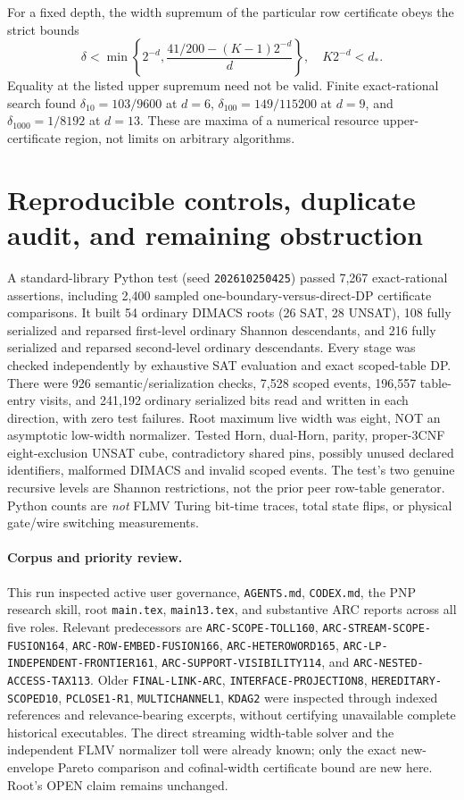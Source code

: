 \documentclass[11pt]{article}
\begin{document}
For a fixed depth, the width supremum of the particular row
certificate obeys the strict bounds
\[
\delta<\min\left\{2^{-d},
 \frac{41/200-(K-1)2^{-d}}{d}\right\},\quad
 K2^{-d}<d_*.\tag{7}
\]
Equality at the listed upper supremum need not be valid.
Finite exact-rational search found $\delta_{10}=103/9600$ at $d=6$,
$\delta_{100}=149/115200$ at $d=9$, and
$\delta_{1000}=1/8192$ at $d=13$. These are maxima of a numerical
resource upper-certificate region, not limits on arbitrary algorithms.

\section{Reproducible controls, duplicate audit, and remaining obstruction}
A standard-library Python test (seed \texttt{202610250425}) passed
7,267 exact-rational assertions, including 2,400 sampled
one-boundary-versus-direct-DP certificate comparisons. It built 54
ordinary DIMACS roots (26 SAT, 28 UNSAT), 108 fully serialized and
reparsed first-level ordinary Shannon descendants, and 216 fully
serialized and reparsed second-level ordinary descendants. Every
stage was checked independently by exhaustive SAT evaluation and
exact scoped-table DP. There were 926 semantic/serialization checks,
7,528 scoped events, 196,557 table-entry visits, and 241,192
ordinary serialized bits read and written in each direction, with
zero test failures. Root maximum live width was eight, NOT an
asymptotic low-width normalizer. Tested Horn, dual-Horn, parity,
proper-3CNF eight-exclusion UNSAT cube, contradictory shared pins,
possibly unused declared identifiers, malformed DIMACS and invalid
scoped events. The test's two genuine recursive levels are Shannon
restrictions, not the prior peer row-table generator. Python counts
are \emph{not} FLMV Turing bit-time traces, total state flips, or
physical gate/wire switching measurements.

\paragraph{Corpus and priority review.}
This run inspected active user governance, \texttt{AGENTS.md},
\texttt{CODEX.md}, the PNP research skill, root
\texttt{main.tex}, \texttt{main13.tex}, and substantive ARC reports
across all five roles. Relevant predecessors are
\texttt{ARC-SCOPE-TOLL160},
\texttt{ARC-STREAM-SCOPE-FUSION164},
\texttt{ARC-ROW-EMBED-FUSION166},
\texttt{ARC-HETEROWORD165},
\texttt{ARC-LP-INDEPENDENT-FRONTIER161},
\texttt{ARC-SUPPORT-VISIBILITY114}, and
\texttt{ARC-NESTED-ACCESS-TAX113}. Older
\texttt{FINAL-LINK-ARC}, \texttt{INTERFACE-PROJECTION8},
\texttt{HEREDITARY-SCOPED10}, \texttt{PCLOSE1-R1},
\texttt{MULTICHANNEL1}, \texttt{KDAG2} were inspected through
indexed references and relevance-bearing excerpts, without
certifying unavailable complete historical executables.
The direct streaming width-table solver and the independent
FLMV normalizer toll were already known; only the exact
new-envelope Pareto comparison and cofinal-width certificate
bound are new here. Root's OPEN claim remains unchanged.
\end{document}
